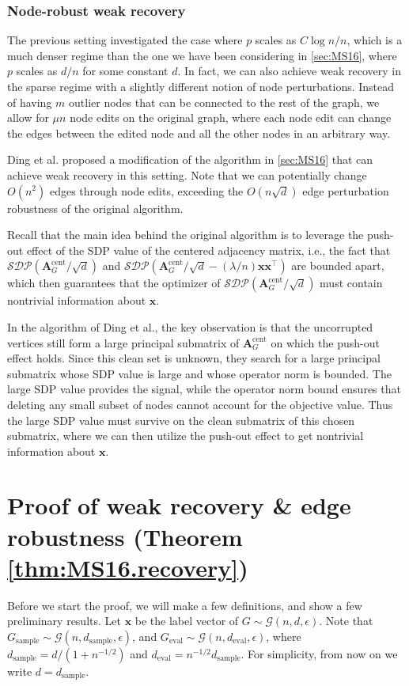 \documentclass[11pt, titlepage]{article} %
\numberwithin{equation}{section}
\theoremstyle{definition}
\numberwithin{theorem}{section}
\numberwithin{lemma}{section}
\numberwithin{corollary}{section}
\numberwithin{proposition}{section}
\numberwithin{definition}{section}
\numberwithin{remark}{section}
\begin{document}
\subsubsection{Node-robust weak recovery}
The previous setting investigated the case where $p$ scales as $C\log n / n$, which is a much denser
regime than the one we have been considering in \cref{sec:MS16}, where $p$ scales as $d/n$ for some
constant $d$. In fact, we can also achieve weak recovery in the sparse regime with a slightly
different notion of node perturbations. Instead of having $m$ outlier nodes that can be connected to
the rest of the graph, we allow for $\mu n$ node edits on the original graph, where each node edit
can change the edges between the edited node and all the other nodes in an arbitrary way.

Ding et al. \cite{DdHS23} proposed a modification of the algorithm in \cref{sec:MS16} that can
achieve weak recovery in this setting. Note that we can potentially change $O(n^2)$ edges through 
node edits, exceeding the $O(n\sqrt{d})$ edge perturbation robustness of the original algorithm.

Recall that the main idea behind the original algorithm is to leverage the push-out effect of the
SDP value of the centered adjacency matrix, i.e., the fact that $\mathcal{SDP}(\bm{A}_G^{\mathrm{cent}}/\sqrt{d})$
and $\mathcal{SDP}(\bm{A}_G^{\mathrm{cent}}/\sqrt{d} - (\lambda / n)\bm{x}\bm{x}^\top)$ are bounded 
apart, which then guarantees that the optimizer of $\mathcal{SDP}(\bm{A}_G^{\mathrm{cent}}/\sqrt{d})$
must contain nontrivial information about $\bm{x}$. 

In the algorithm of Ding et al., the key observation is that the uncorrupted vertices still form a 
large principal submatrix of $\bm{A}_G^{\mathrm{cent}}$ on which the push-out effect holds. Since 
this clean set is unknown, they search for a large principal submatrix whose SDP value is large and
whose operator norm is bounded. The large SDP value provides the signal, while the operator norm bound
ensures that deleting any small subset of nodes cannot account for the objective value. Thus the large
SDP value must survive on the clean submatrix of this chosen submatrix, where we can then
utilize the push-out effect to get nontrivial information about $\bm{x}$.

\section{Proof of weak recovery \& edge robustness (Theorem \ref{thm:MS16.recovery})}
\label{sec:weak.recovery}
Before we start the proof, we will make a few definitions, and show a few preliminary results.
Let $\bm{x}$ be the label vector of $G \sim \mathcal{G}(n, d, \epsilon)$. Note that 
$G_\mathrm{sample} \sim \mathcal{G}(n, d_\mathrm{sample}, \epsilon)$, 
and $G_\mathrm{eval} \sim \mathcal{G}(n, d_\mathrm{eval}, \epsilon)$, 
where $d_\mathrm{sample} = d/(1 + n^{-1/2})$ and $d_\mathrm{eval} = n^{-1/2}d_\mathrm{sample}$.
For simplicity, from now on we write $d = d_\mathrm{sample}$.
\end{document}
